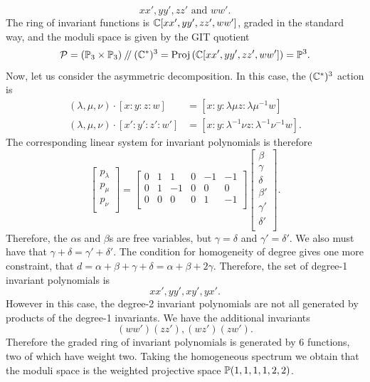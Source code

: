 	\begin{equation}
		xx', yy', zz' \text{ and } ww'.
	\end{equation}
	The ring of invariant functions is $\mathbb{C}[xx',yy',zz',ww']$, graded in the standard way, and the moduli space is given by the GIT quotient
	\begin{equation}
		\mathcal{P} = (\mathbb{P}_3 \times \mathbb{P}_3)\mathbin{/\mkern-4mu/} (\mathbb{C}^\ast)^3 = \text{Proj} \left(\mathbb{C}[xx',yy',zz',ww']\right) = \mathbb{P}^3.
	\end{equation}
	Now, let us consider the asymmetric decomposition. In this case, the $(\mathbb{C}^\ast)^3$ action is
	\begin{align*}
	(\lambda, \mu,\nu)\cdot [x:y:z:w] &= [x:y: \lambda \mu z: \lambda\mu^{-1} w]\\
	(\lambda, \mu,\nu)\cdot [x':y':z':w'] &= [x: y: \lambda^{-1} \nu z: \lambda^{-1}\nu^{-1} w].
	\end{align*}
	The corresponding linear system for invariant polynomials is therefore
		\begin{equation}
	\begin{bmatrix}
	p_\lambda \\
	p_\mu \\
	p_\nu \\
	\end{bmatrix} = \begin{bmatrix}
	0 & 1 & 1 & 0 & -1 & -1\\
	0 & 1 & -1 & 0 & 0 & 0\\
	0 & 0 & 0 & 0 & 1 & -1\\
	\end{bmatrix}\begin{bmatrix}
	\beta \\
	\gamma \\
	\delta \\
	\beta' \\
	\gamma'\\
	\delta '\\
	\end{bmatrix}.
	\end{equation}
	Therefore, the $\alpha$s and $\beta$s are free variables, but $\gamma = \delta$ and $\gamma' = \delta'$. We also must have that $\gamma+\delta = \gamma'+\delta'$. The condition for homogeneity of degree gives one more constraint, that $d=\alpha+\beta+\gamma+\delta = \alpha + \beta + 2\gamma$. Therefore, the set of degree-1 invariant polynomials is
	\begin{equation}
		xx', yy', xy', yx'.
	\end{equation}
	However in this case, the degree-2 invariant polynomials are not all generated by products of the degree-1 invariants. We have the additional invariants
	\begin{equation}
		(ww')(zz'), (wz')(zw').
	\end{equation}
	Therefore the graded ring of invariant polynomials is generated by 6 functions, two of which have weight two. Taking the homogeneous spectrum we obtain that the moduli space  is the weighted projective space $\mathbb{P}(1,1,1,1,2,2)$.